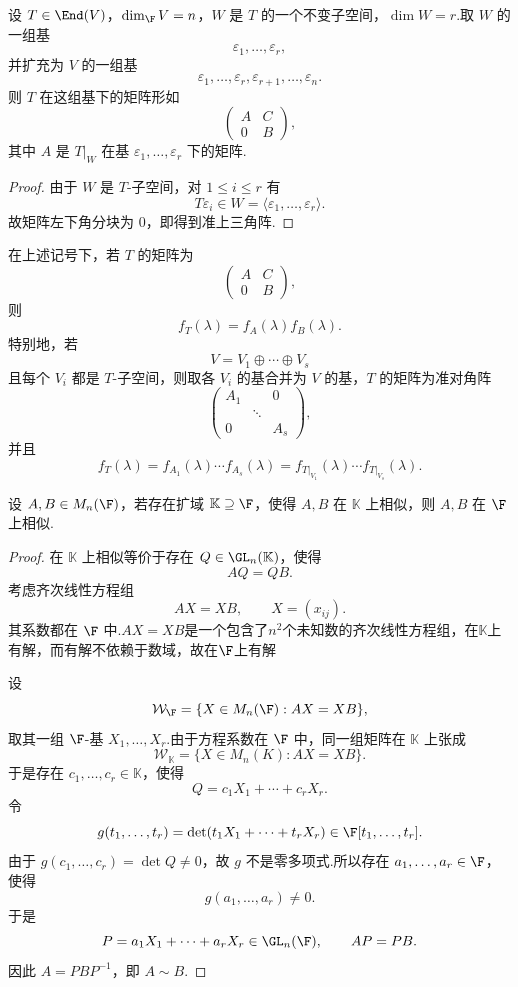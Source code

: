 \begin{proposition}
	设 $T\in\End(V)$，$\dim_{\F}V=n$，$W$ 是 $T$ 的一个不变子空间，$\dim W=r$.取 $W$ 的一组基
	\[
	\varepsilon_1,\ldots,\varepsilon_r,
	\]
	并扩充为 $V$ 的一组基
	\[
	\varepsilon_1,\ldots,\varepsilon_r,\varepsilon_{r+1},\ldots,\varepsilon_n.
	\]
	则 $T$ 在这组基下的矩阵形如
	\[
	\begin{pmatrix}
		A&C\\
		0&B
	\end{pmatrix},
	\]
	其中 $A$ 是 $T|_W$ 在基 $\varepsilon_1,
	\ldots,\varepsilon_r$ 下的矩阵.
\end{proposition}

\begin{proof}
	由于 $W$ 是 $T$-子空间，对 $1\leq i\leq r$ 有
	\[
	T\varepsilon_i\in W=\langle \varepsilon_1,\ldots,\varepsilon_r\rangle.
	\]
	故矩阵左下角分块为 $0$，即得到准上三角阵.
\end{proof}

\begin{corollary}
	在上述记号下，若 $T$ 的矩阵为
	\[
	\begin{pmatrix}
		A&C\\
		0&B
	\end{pmatrix},
	\]
	则
	\[
	f_T(\lambda)=f_A(\lambda)f_B(\lambda).
	\]
	特别地，若
	\[
	V=V_1\oplus\cdots\oplus V_s
	\]
	且每个 $V_i$ 都是 $T$-子空间，则取各 $V_i$ 的基合并为 $V$ 的基，$T$ 的矩阵为准对角阵
	\[
	\begin{pmatrix}
		A_1&&0\\
		&\ddots&\\
		0&&A_s
	\end{pmatrix},
	\]
	并且
	\[
	f_T(\lambda)=f_{A_1}(\lambda)
	\cdots f_{A_s}(\lambda)
	=f_{T|_{V_1}}(\lambda)
	\cdots f_{T|_{V_s}}(\lambda).
	\]
\end{corollary}

\begin{proposition}
	设 $A,B\in M_n(\F)$，若存在扩域 $\mathbb{K}\supseteq\F$，使得 $A,B$ 在 $\mathbb{K}$ 上相似，则 $A,B$ 在 $\F$ 上相似.
\end{proposition}

\begin{proof}
	在 $\mathbb{K}$ 上相似等价于存在 $Q\in \GL_n(\mathbb{K})$，使得
	\[
	AQ=QB.
	\]
	考虑齐次线性方程组
	\[
	AX=XB,
	\qquad X=(x_{ij}).
	\]
	其系数都在 $\F$ 中.$AX=XB$是一个包含了$n^2$个未知数的齐次线性方程组，在$\mathbb{K}$上有解，而有解不依赖于数域，故在$\F$上有解
	
	设
	\[
	\mathcal W_{\F}=\{X\in M_n(\F):AX=XB\},
	\]
	取其一组 $\F$-基 $X_1,
	\ldots,X_r$.由于方程系数在 $\F$ 中，同一组矩阵在 $\mathbb{K}$ 上张成
	\[
	\mathcal W_{\mathbb{K}}=\{X\in M_n(K):AX=XB\}.
	\]
	于是存在 $c_1,
	\ldots,c_r\in \mathbb{K}$，使得
	\[
	Q=c_1X_1+\cdots+c_rX_r.
	\]
	令
	\[
	g(t_1,
	\ldots,t_r)=\det(t_1X_1+
	\cdots+t_rX_r)\in\F[t_1,
	\ldots,t_r].
	\]
	由于 $g(c_1,
	\ldots,c_r)=\det Q\neq0$，故 $g$ 不是零多项式.所以存在 $a_1,
	\ldots,a_r\in\F$，使得
	\[
	g(a_1,
	\ldots,a_r)\neq0.
	\]
	于是
	\[
	P=a_1X_1+\cdots+a_rX_r\in \GL_n(\F),
	\qquad AP=PB.
	\]
	因此 $A=PBP^{-1}$，即 $A\sim B$.
\end{proof}



